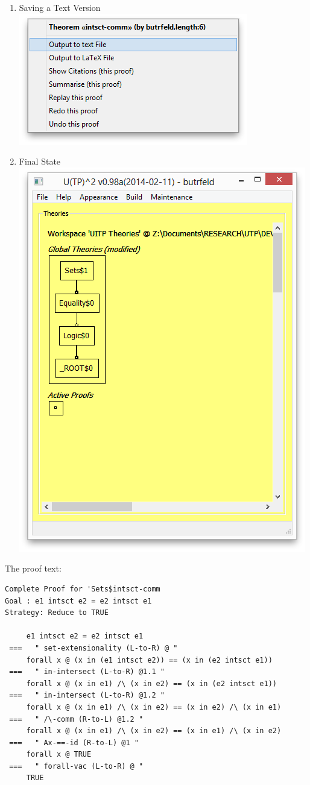 \begin{enumerate}
  \item Saving a Text Version
  \\\includegraphics[scale=0.5]{SCREENSHOTS/21-saving-text-version.png}
  \newpage
  \item Final State
  \\\includegraphics[scale=0.5]{SCREENSHOTS/22-final-state.png}
  \end{enumerate}

The proof text:
\begin{verbatim}
Complete Proof for 'Sets$intsct-comm
Goal : e1 intsct e2 = e2 intsct e1
Strategy: Reduce to TRUE

     e1 intsct e2 = e2 intsct e1
 ===   " set-extensionality (L-to-R) @ "
     forall x @ (x in (e1 intsct e2)) == (x in (e2 intsct e1))
 ===   " in-intersect (L-to-R) @1.1 "
     forall x @ (x in e1) /\ (x in e2) == (x in (e2 intsct e1))
 ===   " in-intersect (L-to-R) @1.2 "
     forall x @ (x in e1) /\ (x in e2) == (x in e2) /\ (x in e1)
 ===   " /\-comm (R-to-L) @1.2 "
     forall x @ (x in e1) /\ (x in e2) == (x in e1) /\ (x in e2)
 ===   " Ax-==-id (R-to-L) @1 "
     forall x @ TRUE
 ===   " forall-vac (L-to-R) @ "
     TRUE
\end{verbatim}
